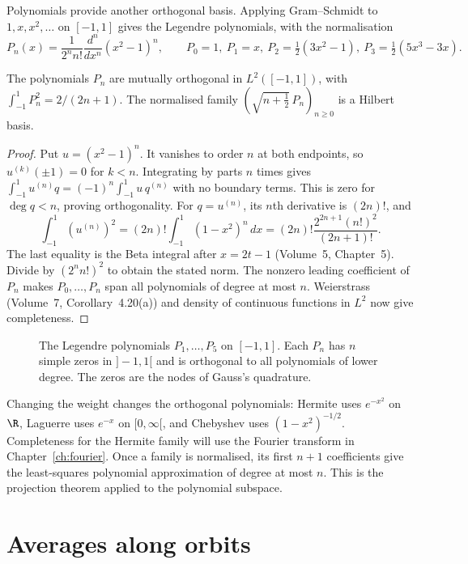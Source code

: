 Polynomials provide another orthogonal basis. Applying Gram--Schmidt to $1,x,x^2,\dots$ on $[-1,1]$ gives the Legendre polynomials, with the normalisation
\[P_n(x)=\frac1{2^nn!}\frac{d^n}{dx^n}(x^2-1)^n,\qquad P_0=1,\ P_1=x,\ P_2=\tfrac12(3x^2-1),\ P_3=\tfrac12(5x^3-3x).\]

\begin{proposition}\label{prop:legendre}
The polynomials $P_n$ are mutually orthogonal in $L^2([-1,1])$, with $\int_{-1}^1P_n^2=2/(2n+1)$. The normalised family $(\sqrt{n+\frac12}\,P_n)_{n\ge0}$ is a Hilbert basis.
\end{proposition}
\begin{proof}
Put $u=(x^2-1)^n$. It vanishes to order $n$ at both endpoints, so $u^{(k)}(\pm1)=0$ for $k<n$. Integrating by parts $n$ times gives $\int_{-1}^1u^{(n)}q=(-1)^n\int_{-1}^1u\,q^{(n)}$ with no boundary terms. This is zero for $\deg q<n$, proving orthogonality. For $q=u^{(n)}$, its $n$th derivative is $(2n)!$, and
\[\int_{-1}^1(u^{(n)})^2=(2n)!\int_{-1}^1(1-x^2)^n\,dx=(2n)!\frac{2^{2n+1}(n!)^2}{(2n+1)!}.\]
The last equality is the Beta integral after $x=2t-1$ (Volume~5, Chapter~5). Divide by $(2^nn!)^2$ to obtain the stated norm. The nonzero leading coefficient of $P_n$ makes $P_0,\dots,P_n$ span all polynomials of degree at most $n$. Weierstrass (Volume~7, Corollary~4.20(a)) and density of continuous functions in $L^2$ now give completeness.
\end{proof}

\begin{figure}[ht]
\centering
{}
\caption{The Legendre polynomials $P_1,\dots,P_5$ on $[-1,1]$. Each $P_n$ has $n$ simple zeros in $]-1,1[$ and is orthogonal to all polynomials of lower degree. The zeros are the nodes of Gauss's quadrature.}
\label{fig:legendre}
\end{figure}


Changing the weight changes the orthogonal polynomials: Hermite uses $e^{-x^2}$ on $\R$, Laguerre uses $e^{-x}$ on $[0,\infty[$, and Chebyshev uses $(1-x^2)^{-1/2}$. Completeness for the Hermite family will use the Fourier transform in Chapter~\ref{ch:fourier}. Once a family is normalised, its first $n+1$ coefficients give the least-squares polynomial approximation of degree at most $n$. This is the projection theorem applied to the polynomial subspace.

\section{Averages along orbits}

